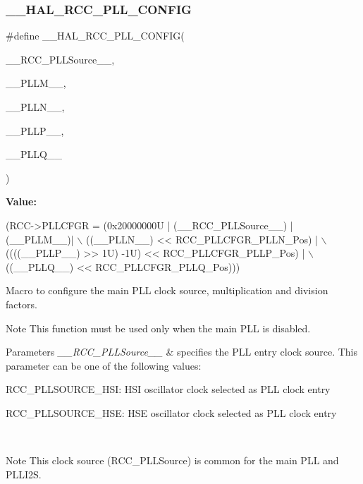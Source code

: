 \subsubsection{\texorpdfstring{\+\_\+\+\_\+\+H\+A\+L\+\_\+\+R\+C\+C\+\_\+\+P\+L\+L\+\_\+\+C\+O\+N\+F\+IG}{\_\_HAL\_RCC\_PLL\_CONFIG}}
{\footnotesize\ttfamily \#define \+\_\+\+\_\+\+H\+A\+L\+\_\+\+R\+C\+C\+\_\+\+P\+L\+L\+\_\+\+C\+O\+N\+F\+IG(\begin{DoxyParamCaption}\item[{}]{\+\_\+\+\_\+\+R\+C\+C\+\_\+\+P\+L\+L\+Source\+\_\+\+\_\+,  }\item[{}]{\+\_\+\+\_\+\+P\+L\+L\+M\+\_\+\+\_\+,  }\item[{}]{\+\_\+\+\_\+\+P\+L\+L\+N\+\_\+\+\_\+,  }\item[{}]{\+\_\+\+\_\+\+P\+L\+L\+P\+\_\+\+\_\+,  }\item[{}]{\+\_\+\+\_\+\+P\+L\+L\+Q\+\_\+\+\_\+ }\end{DoxyParamCaption})}

{\bfseries Value\+:}
\begin{DoxyCode}
(RCC->PLLCFGR = (0x20000000U | (\_\_RCC\_PLLSource\_\_) | (\_\_PLLM\_\_)| \(\backslash\)
                            ((\_\_PLLN\_\_) << RCC\_PLLCFGR\_PLLN\_Pos)                | \(\backslash\)
                            ((((\_\_PLLP\_\_) >> 1U) -1U) << RCC\_PLLCFGR\_PLLP\_Pos)    | \(\backslash\)
                            ((\_\_PLLQ\_\_) << RCC\_PLLCFGR\_PLLQ\_Pos)))
\end{DoxyCode}


Macro to configure the main P\+LL clock source, multiplication and division factors. 

\begin{DoxyNote}{Note}
This function must be used only when the main P\+LL is disabled. 
\end{DoxyNote}

\begin{DoxyParams}{Parameters}
{\em \+\_\+\+\_\+\+R\+C\+C\+\_\+\+P\+L\+L\+Source\+\_\+\+\_\+} & specifies the P\+LL entry clock source. This parameter can be one of the following values\+: \begin{DoxyItemize}
\item R\+C\+C\+\_\+\+P\+L\+L\+S\+O\+U\+R\+C\+E\+\_\+\+H\+SI\+: H\+SI oscillator clock selected as P\+LL clock entry \item R\+C\+C\+\_\+\+P\+L\+L\+S\+O\+U\+R\+C\+E\+\_\+\+H\+SE\+: H\+SE oscillator clock selected as P\+LL clock entry \end{DoxyItemize}
\\
\hline
\end{DoxyParams}
\begin{DoxyNote}{Note}
This clock source (R\+C\+C\+\_\+\+P\+L\+L\+Source) is common for the main P\+LL and P\+L\+L\+I2S. ~\newline

\end{DoxyNote}

